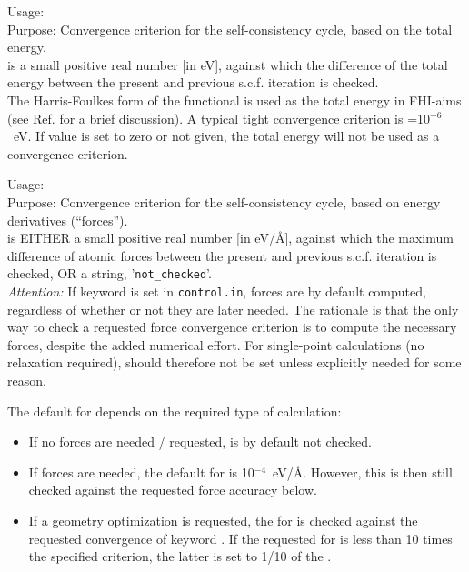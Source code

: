 {
  \noindent
  Usage:   \\[1.0ex]
  Purpose: Convergence criterion for the self-consistency cycle, based
    on the total energy. \\[1.0ex]
   is a small positive real number [in eV], against
  which the difference of the total energy between the present and
  previous s.c.f. iteration is checked. \\
}
The Harris-Foulkes form of the functional is used as the total energy
in FHI-aims (see Ref. \cite{Blum08} for a brief discussion). A typical tight
convergence criterion is =10$^{-6}$~eV. If value is set
to zero or not given, the total energy will not be used as a
convergence criterion. 

{
  \noindent
  Usage:   \\[1.0ex]
  Purpose: Convergence criterion for the self-consistency cycle, based
    on energy derivatives (``forces''). \\[1.0ex]
   is EITHER a small positive real number [in eV/{\AA}],
  against which the maximum difference of atomic forces between the
  present and previous s.c.f. iteration is checked, OR a string,
  '\texttt{not\_checked}'. \\ 
}
\emph{Attention:} If keyword  is set in
\texttt{control.in}, forces are by default computed, regardless of
whether or not they are later needed. The rationale is that the only
way to check a requested force convergence criterion is to compute the
necessary forces, despite the added numerical effort. For single-point
calculations (no relaxation required), 
should therefore not be set unless explicitly needed for some reason.

The default for  depends on the required
type of calculation:
\begin{itemize}
\item If no forces are needed / requested,
   is by default not checked.
\item If forces are needed, the default for  is
  10$^{-4}$~eV/{\AA}. However, this is then still checked against the
  requested  force accuracy below.
\item If a geometry optimization is requested, the  for
   is checked against the requested 
  convergence  of keyword
  . If the requested  for
   is less than 10 times the specified
   criterion, the latter 
  is set to 1/10 of the  .
\end{itemize}

